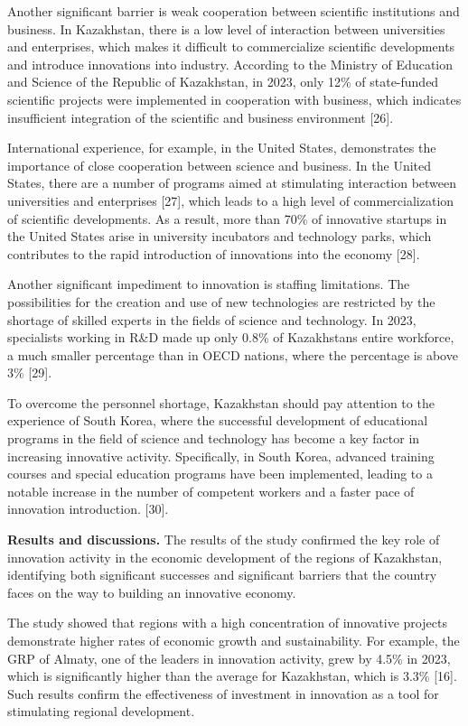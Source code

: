 Another significant barrier is weak cooperation between scientific
institutions and business. In Kazakhstan, there is a low level of
interaction between universities and enterprises, which makes it
difficult to commercialize scientific developments and introduce
innovations into industry. According to the Ministry of Education and
Science of the Republic of Kazakhstan, in 2023, only 12\% of
state-funded scientific projects were implemented in cooperation with
business, which indicates insufficient integration of the scientific and
business environment {[}26{]}.

International experience, for example, in the United States,
demonstrates the importance of close cooperation between science and
business. In the United States, there are a number of programs aimed at
stimulating interaction between universities and enterprises {[}27{]},
which leads to a high level of commercialization of scientific
developments. As a result, more than 70\% of innovative startups in the
United States arise in university incubators and technology parks, which
contributes to the rapid introduction of innovations into the economy
{[}28{]}.

Another significant impediment to innovation is staffing limitations.
The possibilities for the creation and use of new technologies are
restricted by the shortage of skilled experts in the fields of science
and technology. In 2023, specialists working in R\&D made up only 0.8\%
of Kazakhstan\textquotesingle s entire workforce, a much smaller
percentage than in OECD nations, where the percentage is above 3\%
{[}29{]}.

To overcome the personnel shortage, Kazakhstan should pay attention to
the experience of South Korea, where the successful development of
educational programs in the field of science and technology has become a
key factor in increasing innovative activity. Specifically, in South
Korea, advanced training courses and special education programs have
been implemented, leading to a notable increase in the number of
competent workers and a faster pace of innovation introduction.
{[}30{]}.

{\bfseries Results and discussions.} The results of the study confirmed the
key role of innovation activity in the economic development of the
regions of Kazakhstan, identifying both significant successes and
significant barriers that the country faces on the way to building an
innovative economy.

The study showed that regions with a high concentration of innovative
projects demonstrate higher rates of economic growth and sustainability.
For example, the GRP of Almaty, one of the leaders in innovation
activity, grew by 4.5\% in 2023, which is significantly higher than the
average for Kazakhstan, which is 3.3\% {[}16{]}. Such results confirm
the effectiveness of investment in innovation as a tool for stimulating
regional development.

